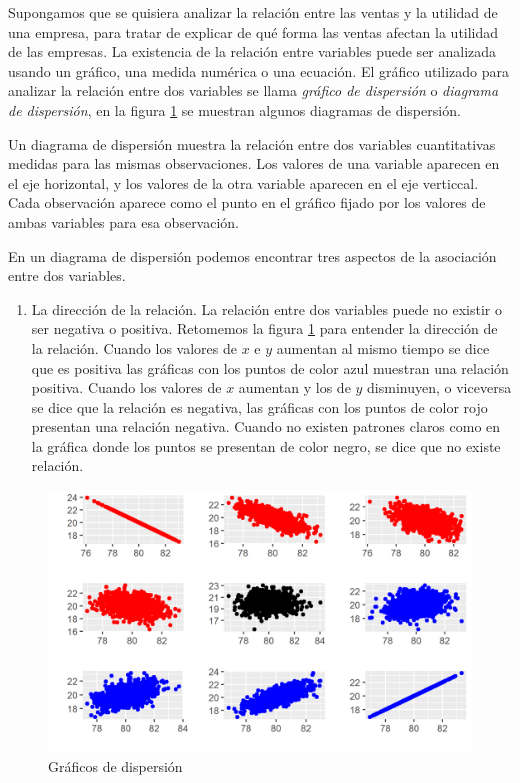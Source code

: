 \documentclass[letterpaper,]{book}
\providecommand{\tightlist}{%
  \setlength{\itemsep}{0pt}\setlength{\parskip}{0pt}}
\begin{document}
Supongamos que se quisiera analizar la relación entre las ventas y la utilidad de una empresa, para tratar de explicar de qué forma las ventas afectan la utilidad de las empresas. La existencia de la relación entre variables puede ser analizada usando un gráfico, una medida numérica o una ecuación.
El gráfico utilizado para analizar la relación entre dos variables se llama \emph{gráfico de dispersión} o \emph{diagrama de dispersión}, en la figura \ref{fig:corr} se muestran algunos diagramas de dispersión.

Un diagrama de dispersión muestra la relación entre dos variables cuantitativas medidas para las mismas observaciones. Los valores de una variable aparecen en el eje horizontal, y los valores de la otra variable aparecen en el eje verticcal. Cada observación aparece como el punto en el gráfico fijado por los valores de ambas variables para esa observación.

En un diagrama de dispersión podemos encontrar tres aspectos de la asociación entre dos variables.

\begin{enumerate}
\def\labelenumi{\arabic{enumi}.}
\tightlist
\item
  La dirección de la relación. La relación entre dos variables puede no existir o ser negativa o positiva. Retomemos la figura \ref{fig:corr} para entender la dirección de la relación. Cuando los valores de \(x\) e \(y\) aumentan al mismo tiempo se dice que es positiva las gráficas con los puntos de color azul muestran una relación positiva. Cuando los valores de \(x\) aumentan y los de \(y\) disminuyen, o viceversa se dice que la relación es negativa, las gráficas con los puntos de color rojo presentan una relación negativa. Cuando no existen patrones claros como en la gráfica donde los puntos se presentan de color negro, se dice que no existe relación.
\end{enumerate}

\begin{figure}[h]

{\centering \includegraphics[width=0.5\linewidth]{corr} 

}

\caption{Gráficos de dispersión}\label{fig:corr}
\end{figure}
\end{document}
